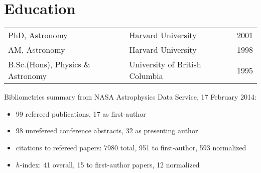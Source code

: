 \documentclass[12pt]{article}
\begin{document}
\maketitle

\section{Education}
\begin{tabular}{lll}
PhD, Astronomy & Harvard University & 2001\\
AM, Astronomy & Harvard University & 1998\\
B.Sc.(Hons),  Physics \& Astronomy & University of British Columbia&1995\\
\end{tabular}


\begin{publications}
Bibliometrics summary from NASA Astrophysics Data Service, 17 February 2014:
\begin{itemize}
\item 99 refereed publications, 17 as first-author
\item 98 unrefereed conference abstracts, 32 as presenting author
\item citations to refereed papers: 7980 total,  951 to first-author, 593 normalized
\item $h$-index: 41 overall, 15 to first-author papers, 12 normalized
\end{itemize}

\printbibliography[title={Refereed publications},keyword=ref]

\setcounter{papers}{0}
\printbibliography[title={Conference presentations},keyword=unref]


\end{publications}
\end{document}
